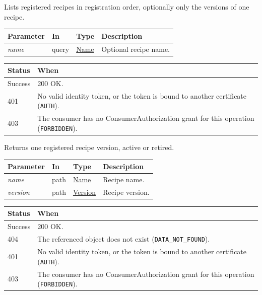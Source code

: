 \documentclass[a4paper]{arrowhead}
\newcommand{\fparam}[1]{\textit{\textcolor{ArrowheadBlue}{#1}}}
\newcommand{\pref}[1]{{\textcolor{ArrowheadGrey}{\hyperref[sec:model:primitives:#1]{#1}}}}
\begin{document}
Lists registered recipes in registration order, optionally only the versions of one recipe.

{\small
\begin{longtable}{|p{3.0cm}|p{1.4cm}|p{3.2cm}|p{8.2cm}|}

\hline
\rowcolor{gray!33} Parameter & In & Type & Description \\ \hline
\endhead
\fparam{name} & query & \pref{Name} & Optional recipe name. \\ \hline
\end{longtable}
}


{\small
\begin{longtable}{|p{2.0cm}|p{13.8cm}|}

\hline
\rowcolor{gray!33} Status & When \\ \hline
\endhead
Success & 200 OK. \\ \hline
401 & No valid identity token, or the token is bound to another certificate (\texttt{AUTH}). \\ \hline
403 & The consumer has no ConsumerAuthorization grant for this operation (\texttt{FORBIDDEN}). \\ \hline
\end{longtable}
}

Returns one registered recipe version, active or retired.

{\small
\begin{longtable}{|p{3.0cm}|p{1.4cm}|p{3.2cm}|p{8.2cm}|}

\hline
\rowcolor{gray!33} Parameter & In & Type & Description \\ \hline
\endhead
\fparam{name} & path & \pref{Name} & Recipe name. \\ \hline
\fparam{version} & path & \pref{Version} & Recipe version. \\ \hline
\end{longtable}
}


{\small
\begin{longtable}{|p{2.0cm}|p{13.8cm}|}

\hline
\rowcolor{gray!33} Status & When \\ \hline
\endhead
Success & 200 OK. \\ \hline
404 & The referenced object does not exist (\texttt{DATA\_NOT\_FOUND}). \\ \hline
401 & No valid identity token, or the token is bound to another certificate (\texttt{AUTH}). \\ \hline
403 & The consumer has no ConsumerAuthorization grant for this operation (\texttt{FORBIDDEN}). \\ \hline
\end{longtable}
}
\end{document}
